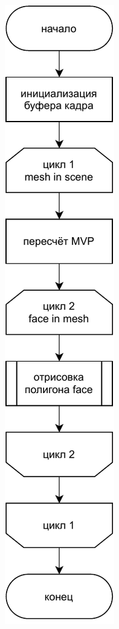 \begin{figure}
    \centering
    \includegraphics[width=\linewidth,height=\textheight,keepaspectratio]{diagrams/fast.pdf}
\end{figure}

